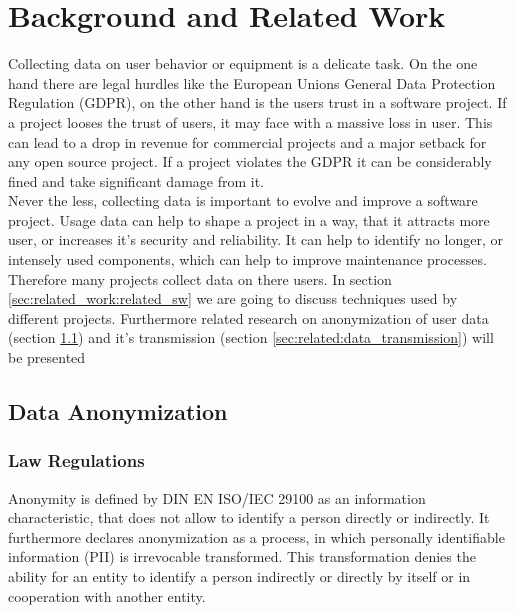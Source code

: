 \chapter{Background and Related Work}
\label{chap:related_work}
%
Collecting data on user behavior or equipment is a delicate task. On the one hand there are legal hurdles like
the European Unions General Data Protection Regulation (GDPR), on the other hand is the users trust
in a software project. If a project looses the trust of users, it may face with a massive loss in
user. This can lead to a drop in revenue for commercial projects and a major setback for any open source
project. If a project violates the GDPR it can be considerably fined and take significant damage from it.\\

Never the less, collecting data is important to evolve and improve a software project. Usage data can help
to shape a project in a way, that it attracts more user, or increases it's security and reliability.
It can help to identify no longer, or intensely used components, which can help to improve maintenance
processes.\\ 



Therefore many projects collect data on there users. In section \ref{sec:related_work:related_sw} we are
going to discuss techniques used by different projects. Furthermore related research on anonymization of user data 
(section \ref{sec:related_work:data_aononymization}) and it's transmission (section \ref{sec:related:data_transmission}) will be presented


\section{Data Anonymization}
\label{sec:related_work:data_aononymization}
%

%
%
\subsection{Law Regulations}
\label{subsec:related:law}
Anonymity is defined by DIN EN ISO/IEC 29100 as an information characteristic, that does not allow to identify a person directly or indirectly\cite{noauthor_din_2020}. It furthermore declares anonymization as a process, in which personally identifiable information (PII) is irrevocable transformed. This transformation denies the ability for an entity to identify a person indirectly or directly by itself or in cooperation with another entity.\\

